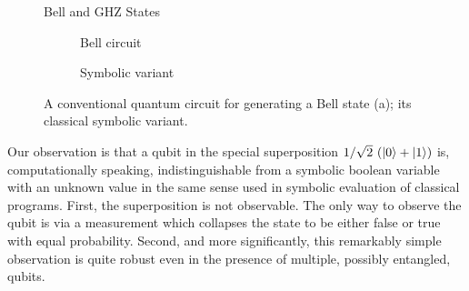 \documentclass[sigplan,review]{acmart}
\theoremstyle{definition}
\begin{document}
\begin{figure}[b]
\begin{center}
\qquad\qquad
{}
\end{center}
\caption{\label{fig:bell2}Bell and GHZ States}
\end{figure}

\begin{figure*}[t]
  \centering
\begin{subfigure}[b]{.25\textwidth}
    \centering
\caption{\label{fig:bellqcore}Bell circuit}
\end{subfigure}
\qquad\qquad
\begin{subfigure}[b]{.25\textwidth}
    \centering
\caption{\label{fig:bellccore}Symbolic variant}
\end{subfigure}
\caption{\label{fig:bellall}A conventional quantum circuit for
  generating a Bell state (a); its classical symbolic variant.}
\end{figure*}

Our observation is that a qubit in the special superposition
$1/\sqrt{2} ~(\ket{0} + \ket{1} )$ is, computationally speaking,
indistinguishable from a symbolic boolean variable with an unknown
value in the same sense used in symbolic evaluation of classical
programs. First, the superposition is not observable. The only way to
observe the qubit is via a measurement which collapses the state to be
either false or true with equal probability. Second, and more
significantly, this remarkably simple observation is quite robust even
in the presence of multiple, possibly entangled, qubits.
\end{document}
